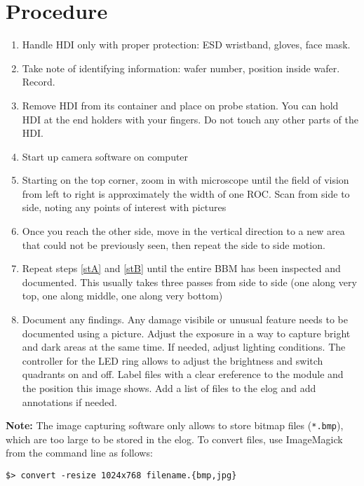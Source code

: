 \documentclass[12pt]{unlsilabsop}
\begin{document}
\section{Procedure}

\begin{enumerate}
    \item Handle HDI only with proper protection: ESD wristband, gloves, face mask.
    \item Take note of identifying information: wafer number, position inside wafer. Record.
    \item Remove HDI from its container and place on probe station. You can hold HDI at the end holders with your fingers. Do not touch any other parts of the HDI.
    \item Start up camera software on computer
    \item \label{stA} Starting on the top corner, zoom in with microscope until the field of vision from left to right is approximately the width of one ROC.  Scan from side to side, noting any points of interest with pictures
    \item \label{stB} Once you reach the other side, move in the vertical direction to a new area that could not be previously seen, then repeat the side to side motion.
    \item Repeat steps \ref{stA} and \ref{stB} until the entire BBM has been inspected and documented.  This usually takes three passes from side to side (one along very top, one along middle, one along very bottom)
    \item Document any findings. Any damage visibile or unusual feature needs to be documented using a picture. Adjust the exposure in a way to capture bright and dark areas at the same time. If needed, adjust lighting conditions. The controller for the LED ring allows to adjust the brightness and switch quadrants on and off. Label files with a clear ereference to the module and the position this image shows. Add a list of files to the elog and add annotations if needed.
\end{enumerate}
\textbf{Note:} The image capturing software only allows to store bitmap files (\texttt{*.bmp}), which are too large to be stored in the elog. To convert files, use ImageMagick from the command line as follows:

\medskip

\texttt{\$> convert -resize 1024x768 filename.\{bmp,jpg\}}
\end{document}
